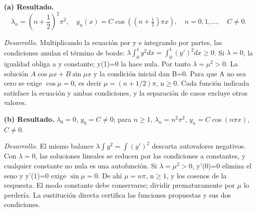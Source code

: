 \noindent\textbf{(a) Resultado.} \[\lambda_n=\left(n+\frac12\right)^2\pi^2,\quad
y_n(x)=C\cos\left((n+\tfrac12)\pi x\right),\quad n=0,1,\ldots,\quad C\ne0.\]

\noindent\textit{Desarrollo.} Multiplicando la ecuación por y e integrando por partes, las condiciones anulan
el término de borde: \(\lambda\int_0^1y^2dx=\int_0^1(y')^2dx\ge0\).
Si \(\lambda=0\), la igualdad obliga a y constante; y(1)=0 la hace nula.
Por tanto \(\lambda=\mu^2>0\). La solución \(A\cos\mu x+B\sin\mu x\)
y la condición inicial dan B=0. Para que A no sea cero se exige
\(\cos\mu=0\), es decir \(\mu=(n+1/2)\pi\), n\(\ge0\).
Cada función indicada satisface la ecuación y ambas condiciones, y la separación de casos excluye otros valores.

\medskip

\noindent\textbf{(b) Resultado.} \(\lambda_0=0\), \(y_0=C\ne0\); para \(n\ge1\),
\(\lambda_n=n^2\pi^2\), \(y_n=C\cos(n\pi x)\), \(C\ne0\).

\noindent\textit{Desarrollo.} El mismo balance \(\lambda\int y^2=\int(y')^2\) descarta autovalores negativos.
Con \(\lambda=0\), las soluciones lineales se reducen por las condiciones a constantes,
y cualquier constante no nula es una autofunción. Si \(\lambda=\mu^2>0\),
y'(0)=0 elimina el seno y y'(1)=0 exige \(\sin\mu=0\).
De ahí \(\mu=n\pi\), n\(\ge1\), y los cosenos de la respuesta.
El modo constante debe conservarse; dividir prematuramente por \(\mu\) lo perdería.
La sustitución directa certifica las funciones propuestas y sus dos condiciones.
